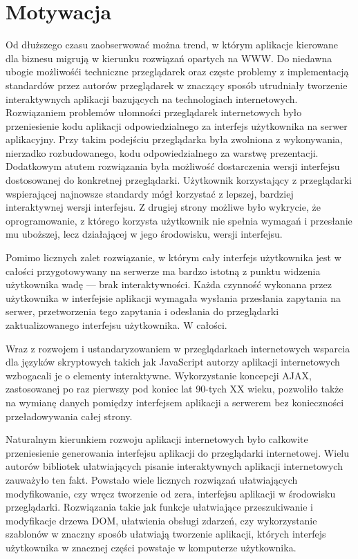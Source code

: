 \chapter{Motywacja}

Od dłuższego czasu zaobserwować można trend, w którym aplikacje kierowane dla biznesu
migrują w kierunku rozwiązań opartych na WWW. Do niedawna ubogie możliwośći techniczne
przeglądarek oraz częste problemy z implementacją standardów przez autorów przeglądarek
w znaczący sposób utrudniały tworzenie interaktywnych aplikacji bazujących na technologiach
internetowych. Rozwiązaniem problemów ułomności przeglądarek internetowych było
przeniesienie kodu aplikacji odpowiedzialnego za interfejs użytkownika na serwer aplikacyjny.
Przy takim podejściu przeglądarka była zwolniona z wykonywania, nierzadko rozbudowanego,
kodu odpowiedzialnego za warstwę prezentacji. Dodatkowym atutem rozwiązania była możliwość
dostarczenia wersji interfejsu dostosowanej do konkretnej przeglądarki. Użytkownik korzystający
z przeglądarki wspierającej najnowsze standardy mógł korzystać z lepszej, bardziej
interaktywnej wersji interfejsu. Z drugiej strony możliwe było wykrycie, że oprogramowanie,
z którego korzysta użytkownik nie spełnia wymagań i przesłanie mu uboższej, lecz działającej
w jego środowisku, wersji interfejsu.

Pomimo licznych zalet rozwiązanie, w którym cały interfejs użytkownika jest w całości
przygotowywany na serwerze ma bardzo istotną z punktu widzenia użytkownika wadę ---
brak interaktywności. Każda czynność wykonana przez użytkownika w interfejsie aplikacji
wymagała wysłania przesłania zapytania na serwer, przetworzenia tego zapytania i odesłania
do przeglądarki zaktualizowanego interfejsu użytkownika. W całości.

Wraz z rozwojem i ustandaryzowaniem w przeglądarkach internetowych wsparcia dla języków
skryptowych takich jak JavaScript autorzy aplikacji internetowych wzbogacali je o elementy
interaktywne. Wykorzystanie koncepcji AJAX, zastosowanej po raz pierwszy pod koniec lat
90-tych XX wieku, pozwoliło także na wymianę danych pomiędzy interfejsem aplikacji a
serwerem bez konieczności przeładowywania całej strony.

Naturalnym kierunkiem rozwoju aplikacji internetowych było całkowite przeniesienie generowania
interfejsu aplikacji do przeglądarki internetowej. Wielu autorów bibliotek ułatwiających
pisanie interaktywnych aplikacji internetowych zauważyło ten fakt. Powstało wiele licznych
rozwiązań ułatwiających modyfikowanie, czy wręcz tworzenie od zera, interfejsu aplikacji
w środowisku przeglądarki. Rozwiązania takie jak funkcje ułatwiające przeszukiwanie i
modyfikacje drzewa DOM, ułatwienia obsługi zdarzeń, czy wykorzystanie szablonów w znaczny
sposób ułatwiają tworzenie aplikacji, których interfejs użytkownika w znacznej części
powstaje w komputerze użytkownika.

